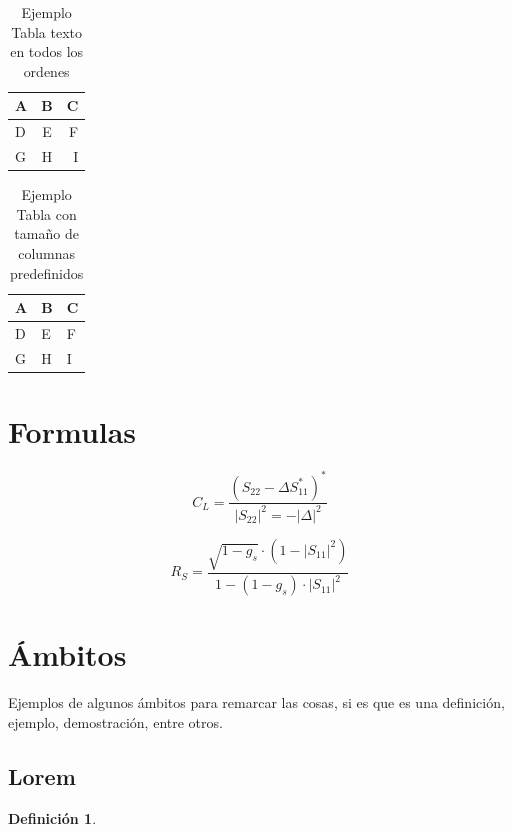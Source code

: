 \documentclass[letter,12pt]{report}
\newtheorem{definir}{Definición}
\begin{document}
\begin{table}[H]
\centering
\begin{tabular}{|l|c|r|}\hline
  A&B &C \\
  \hline
  D&E &F \\
 G & H& I\\\hline
\end{tabular}
\caption{Ejemplo Tabla texto en todos los ordenes}
\label{t:02}
\end{table}

\blindtext %

\begin{table}[H]
\centering
\begin{tabular}{|p{3cm}|p{5cm}|p{2cm}|}\hline
  A&B &C \\
  \hline
  D&E &F \\
 G & H& I\\\hline
\end{tabular}
\caption{Ejemplo Tabla con tamaño de columnas predefinidos}
\label{t:03}
\end{table}
\section{Formulas}

\blindtext %


\begin{displaymath}
C_L=\frac{(S_{22}-\Delta S_{11}^*)^*}{|S_{22}|^2=-|\Delta|^2}
\end{displaymath}
    
\begin{displaymath}
R_S=\frac{\sqrt{1-g_s}\cdot (1-|S_{11}|^2)}{1-(1-g_s)\cdot|S_{11}|^2}
\end{displaymath}


\section{Ámbitos}
Ejemplos de algunos ámbitos para remarcar las cosas, si es que es una definición, ejemplo, demostración, entre otros.
\subsection{Lorem}
\blindtext %

\begin{definir}\label{def:01}
\blindtext %
\end{definir}
\end{document}
